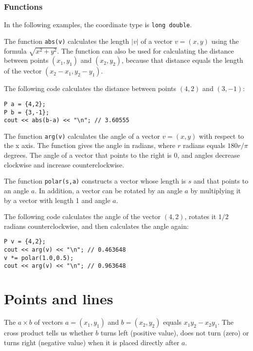 \subsubsection*{Functions}

In the following examples, the coordinate type is
\texttt{long double}.

The function \texttt{abs(v)} calculates the length
$|v|$ of a vector $v=(x,y)$
using the formula $\sqrt{x^2+y^2}$.
The function can also be used for
calculating the distance between points
$(x_1,y_1)$ and $(x_2,y_2)$,
because that distance equals the length
of the vector $(x_2-x_1,y_2-y_1)$.

The following code calculates the distance
between points $(4,2)$ and $(3,-1)$:
\begin{lstlisting}
P a = {4,2};
P b = {3,-1};
cout << abs(b-a) << "\n"; // 3.60555
\end{lstlisting}

The function \texttt{arg(v)} calculates the
angle of a vector $v=(x,y)$ with respect to the x axis.
The function gives the angle in radians,
where $r$ radians equals $180 r/\pi$ degrees.
The angle of a vector that points to the right is 0,
and angles decrease clockwise and increase
counterclockwise.

The function \texttt{polar(s,a)} constructs a vector
whose length is $s$ and that points to an angle $a$.
In addition, a vector can be rotated by an angle $a$
by multiplying it by a vector with length 1 and angle $a$.

The following code calculates the angle of
the vector $(4,2)$, rotates it $1/2$ radians
counterclockwise, and then calculates the angle again:

\begin{lstlisting}
P v = {4,2};
cout << arg(v) << "\n"; // 0.463648
v *= polar(1.0,0.5);
cout << arg(v) << "\n"; // 0.963648
\end{lstlisting}

\section{Points and lines}


The  $a \times b$ of vectors
$a=(x_1,y_1)$ and $b=(x_2,y_2)$ equals $x_1 y_2 - x_2 y_1$.
The cross product tells us whether $b$
turns left (positive value), does not turn (zero)
or turns right (negative value)
when it is placed directly after $a$.

